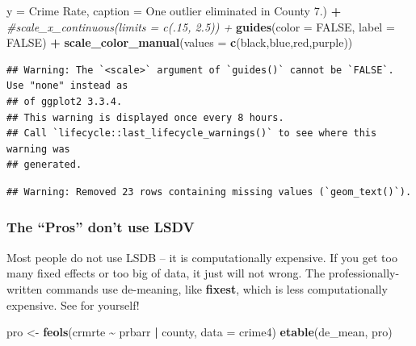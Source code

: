 \documentclass[
]{article}
\newenvironment{Shaded}{\begin{snugshade}}{\end{snugshade}}
\newcommand{\AttributeTok}[1]{\textcolor[rgb]{0.13,0.29,0.53}{#1}}
\newcommand{\CommentTok}[1]{\textcolor[rgb]{0.56,0.35,0.01}{\textit{#1}}}
\newcommand{\ConstantTok}[1]{\textcolor[rgb]{0.56,0.35,0.01}{#1}}
\newcommand{\FunctionTok}[1]{\textcolor[rgb]{0.13,0.29,0.53}{\textbf{#1}}}
\newcommand{\NormalTok}[1]{#1}
\newcommand{\OtherTok}[1]{\textcolor[rgb]{0.56,0.35,0.01}{#1}}
\newcommand{\SpecialCharTok}[1]{\textcolor[rgb]{0.81,0.36,0.00}{\textbf{#1}}}
\newcommand{\StringTok}[1]{\textcolor[rgb]{0.31,0.60,0.02}{#1}}
\begin{document}
\begin{Shaded}
\begin{Highlighting}[]
       \AttributeTok{y =} \StringTok{\textquotesingle{}Crime Rate\textquotesingle{}}\NormalTok{,}
       \AttributeTok{caption =} \StringTok{\textquotesingle{}One outlier eliminated in County 7.\textquotesingle{}}\NormalTok{) }\SpecialCharTok{+} 
  \CommentTok{\#scale\_x\_continuous(limits = c(.15, 2.5)) + }
  \FunctionTok{guides}\NormalTok{(}\AttributeTok{color =} \ConstantTok{FALSE}\NormalTok{, }\AttributeTok{label =} \ConstantTok{FALSE}\NormalTok{) }\SpecialCharTok{+} 
  \FunctionTok{scale\_color\_manual}\NormalTok{(}\AttributeTok{values =} \FunctionTok{c}\NormalTok{(}\StringTok{\textquotesingle{}black\textquotesingle{}}\NormalTok{,}\StringTok{\textquotesingle{}blue\textquotesingle{}}\NormalTok{,}\StringTok{\textquotesingle{}red\textquotesingle{}}\NormalTok{,}\StringTok{\textquotesingle{}purple\textquotesingle{}}\NormalTok{))}
\end{Highlighting}
\end{Shaded}

\begin{verbatim}
## Warning: The `<scale>` argument of `guides()` cannot be `FALSE`. Use "none" instead as
## of ggplot2 3.3.4.
## This warning is displayed once every 8 hours.
## Call `lifecycle::last_lifecycle_warnings()` to see where this warning was
## generated.
\end{verbatim}

\begin{verbatim}
## Warning: Removed 23 rows containing missing values (`geom_text()`).
\end{verbatim}



\hypertarget{the-pros-dont-use-lsdv}{%
\subsubsection{The ``Pros'' don't use
LSDV}\label{the-pros-dont-use-lsdv}}

Most people do not use LSDB -- it is computationally expensive. If you
get too many fixed effects or too big of data, it just will not wrong.
The professionally-written commands use de-meaning, like
\textbf{fixest}, which is less computationally expensive. See for
yourself!

\begin{Shaded}
\begin{Highlighting}[]
\NormalTok{pro }\OtherTok{\textless{}{-}} \FunctionTok{feols}\NormalTok{(crmrte }\SpecialCharTok{\textasciitilde{}}\NormalTok{ prbarr }\SpecialCharTok{|}\NormalTok{ county, }\AttributeTok{data =}\NormalTok{ crime4)}
\FunctionTok{etable}\NormalTok{(de\_mean, pro)}
\end{Highlighting}
\end{Shaded}
\end{document}
